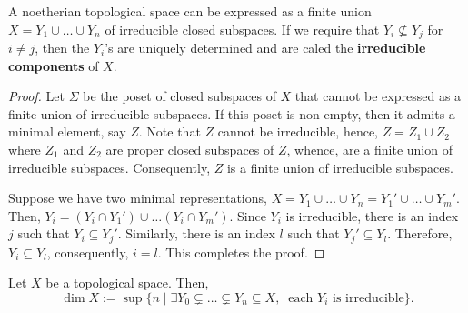 \begin{proposition}
    A noetherian topological space can be expressed as a finite union $X = Y_1\cup\dots\cup Y_n$ of irreducible closed subspaces. If we require that $Y_i\not\subseteq Y_j$ for $i\ne j$, then the $Y_i$'s are uniquely determined and are caled the \textbf{irreducible components} of $X$.
\end{proposition}
\begin{proof}
    Let $\Sigma$ be the poset of closed subspaces of $X$ that cannot be expressed as a finite union of irreducible subspaces. If this poset is non-empty, then it admits a minimal element, say $Z$. Note that $Z$ cannot be irreducible, hence, $Z = Z_1\cup Z_2$ where $Z_1$ and $Z_2$ are proper closed subspaces of $Z$, whence, are a finite union of irreducible subspaces. Consequently, $Z$ is a finite union of irreducible subspaces.

    Suppose we have two minimal representations, $X = Y_1\cup\dots\cup Y_n = Y_1'\cup\dots\cup Y_m'$. Then, $Y_i = (Y_i\cap Y_1')\cup\dots(Y_i\cap Y_m')$. Since $Y_i$ is irreducible, there is an index $j$ such that $Y_i\subseteq Y_j'$. Similarly, there is an index $l$ such that $Y_j'\subseteq Y_l$. Therefore, $Y_i\subseteq Y_l$, consequently, $i = l$. This completes the proof.
\end{proof}

\begin{definition}[Dimension]
    Let $X$ be a topological space. Then, 
    \begin{equation*}
        \dim X := \sup\{n\mid\exists Y_0\subsetneq\dots\subsetneq Y_n\subseteq X,~\text{ each $Y_i$ is irreducible}\}.
    \end{equation*}
\end{definition}

